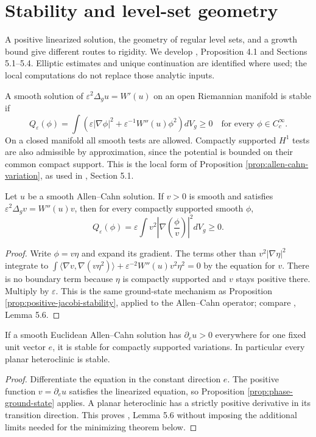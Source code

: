 \chapter{Stability and level-set geometry}\label{sec:phase-stability}
A positive linearized solution, the geometry of regular level sets, and a growth bound give different routes to rigidity. We develop \cite{ChAC}, Proposition 4.1 and Sections 5.1--5.4. Elliptic estimates and unique continuation are identified where used; the local computations do not replace those analytic inputs.

\begin{definition}\label{def:phase-local-stability}
A smooth solution of $\varepsilon^2\Delta_g u=W'(u)$ on an open Riemannian manifold is stable if
\[
 Q_\varepsilon(\phi)=\int\left(\varepsilon|\nabla\phi|^2+
 \varepsilon^{-1}W''(u)\phi^2\right)dV_g\geq0
 \quad\text{for every }\phi\in C_c^\infty.
\]
On a closed manifold all smooth tests are allowed. Compactly supported $H^1$ tests are also admissible by approximation, since the potential is bounded on their common compact support. This is the local form of Proposition \ref{prop:allen-cahn-variation}, as used in \cite{ChAC}, Section 5.1.
\end{definition}

\begin{proposition}\label{prop:phase-ground-state}
Let $u$ be a smooth Allen--Cahn solution. If $v>0$ is smooth and satisfies $\varepsilon^2\Delta_g v=W''(u)v$, then for every compactly supported smooth $\phi$,
\[
 Q_\varepsilon(\phi)=\varepsilon\int v^2
 \left|\nabla\left(\frac\phi v\right)\right|^2dV_g\geq0.
\]
\end{proposition}
\begin{proof}
Write $\phi=v\eta$ and expand its gradient. The terms other than $v^2|\nabla\eta|^2$ integrate to
$\int\langle\nabla v,\nabla(v\eta^2)\rangle+
\varepsilon^{-2}W''(u)v^2\eta^2=0$ by the equation for $v$. There is no boundary term because $\eta$ is compactly supported and $v$ stays positive there. Multiply by $\varepsilon$. This is the same ground-state mechanism as Proposition \ref{prop:positive-jacobi-stability}, applied to the Allen--Cahn operator; compare \cite{ChAC}, Lemma 5.6.
\end{proof}

\begin{corollary}\label{cor:phase-monotone-stability}
If a smooth Euclidean Allen--Cahn solution has $\partial_eu>0$ everywhere for one fixed unit vector $e$, it is stable for compactly supported variations. In particular every planar heteroclinic is stable.
\end{corollary}
\begin{proof}
Differentiate the equation in the constant direction $e$. The positive function $v=\partial_eu$ satisfies the linearized equation, so Proposition \ref{prop:phase-ground-state} applies. A planar heteroclinic has a strictly positive derivative in its transition direction. This proves \cite{ChAC}, Lemma 5.6 without imposing the additional limits needed for the minimizing theorem below.
\end{proof}

